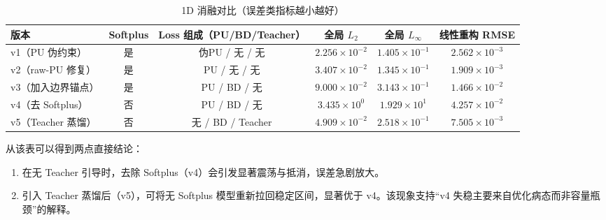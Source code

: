 ﻿\documentclass[lang=cn,a4paper]{elegantpaper}
\begin{document}
\begin{table}[htbp]
  \centering
  \small
  \caption{1D 消融对比（误差类指标越小越好）}
  \label{tab:ablation-v1-v5}
  \begin{tabular}{lccccc}
    \toprule
    版本 & Softplus & Loss 组成（PU/BD/Teacher） & 全局 $L_2$ & 全局 $L_\infty$ & 线性重构 RMSE \\
    \midrule
    v1（PU 伪约束）      & 是 & 伪PU / 无 / 无      & $2.256\times10^{-2}$ & $1.405\times10^{-1}$ & $2.562\times10^{-3}$ \\
    v2（raw-PU 修复）    & 是 & PU / 无 / 无        & $3.407\times10^{-2}$ & $1.345\times10^{-1}$ & $1.909\times10^{-3}$ \\
    v3（加入边界锚点）   & 是 & PU / BD / 无        & $9.000\times10^{-2}$ & $3.143\times10^{-1}$ & $1.466\times10^{-2}$ \\
    v4（去 Softplus）    & 否 & PU / BD / 无        & $3.435\times10^{0}$  & $1.929\times10^{1}$  & $4.257\times10^{-2}$ \\
    v5（Teacher 蒸馏）   & 否 & 无 / BD / Teacher   & $4.909\times10^{-2}$ & $2.518\times10^{-1}$ & $7.505\times10^{-3}$ \\
    \bottomrule
  \end{tabular}
\end{table}

从该表可以得到两点直接结论：
\begin{enumerate}[label=\arabic*.]
  \item 在无 Teacher 引导时，去除 Softplus（v4）会引发显著震荡与抵消，误差急剧放大。
  \item 引入 Teacher 蒸馏后（v5），可将无 Softplus 模型重新拉回稳定区间，显著优于 v4。该现象支持“v4 失稳主要来自优化病态而非容量瓶颈”的解释。
\end{enumerate}
\end{document}
